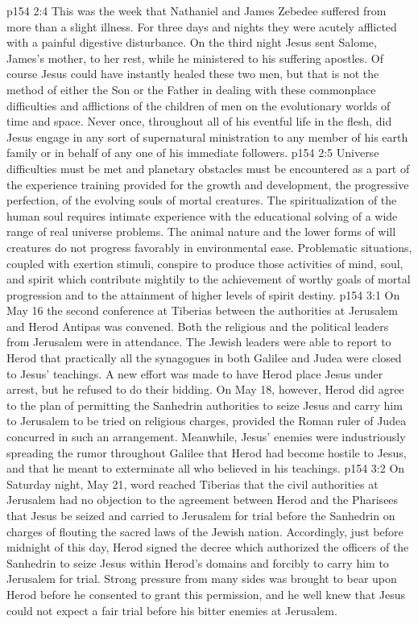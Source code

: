 \vs p154 2:4 \pc This was the week that Nathaniel and James Zebedee suffered from more than a slight illness. For three days and nights they were acutely afflicted with a painful digestive disturbance. On the third night Jesus sent Salome, James’s mother, to her rest, while he ministered to his suffering apostles. Of course Jesus could have instantly healed these two men, but that is not the method of either the Son or the Father in dealing with these commonplace difficulties and afflictions of the children of men on the evolutionary worlds of time and space. Never once, throughout all of his eventful life in the flesh, did Jesus engage in any sort of supernatural ministration to any member of his earth family or in behalf of any one of his immediate followers.
\vs p154 2:5 Universe difficulties must be met and planetary obstacles must be encountered as a part of the experience training provided for the growth and development, the progressive perfection, of the evolving souls of mortal creatures. The spiritualization of the human soul requires intimate experience with the educational solving of a wide range of real universe problems. The animal nature and the lower forms of will creatures do not progress favorably in environmental ease. Problematic situations, coupled with exertion stimuli, conspire to produce those activities of mind, soul, and spirit which contribute mightily to the achievement of worthy goals of mortal progression and to the attainment of higher levels of spirit destiny.
\vs p154 3:1 On May 16 the second conference at Tiberias between the authorities at Jerusalem and Herod Antipas was convened. Both the religious and the political leaders from Jerusalem were in attendance. The Jewish leaders were able to report to Herod that practically all the synagogues in both Galilee and Judea were closed to Jesus’ teachings. A new effort was made to have Herod place Jesus under arrest, but he refused to do their bidding. On May 18, however, Herod did agree to the plan of permitting the Sanhedrin authorities to seize Jesus and carry him to Jerusalem to be tried on religious charges, provided the Roman ruler of Judea concurred in such an arrangement. Meanwhile, Jesus’ enemies were industriously spreading the rumor throughout Galilee that Herod had become hostile to Jesus, and that he meant to exterminate all who believed in his teachings.
\vs p154 3:2 On Saturday night, May 21, word reached Tiberias that the civil authorities at Jerusalem had no objection to the agreement between Herod and the Pharisees that Jesus be seized and carried to Jerusalem for trial before the Sanhedrin on charges of flouting the sacred laws of the Jewish nation. Accordingly, just before midnight of this day, Herod signed the decree which authorized the officers of the Sanhedrin to seize Jesus within Herod’s domains and forcibly to carry him to Jerusalem for trial. Strong pressure from many sides was brought to bear upon Herod before he consented to grant this permission, and he well knew that Jesus could not expect a fair trial before his bitter enemies at Jerusalem.
